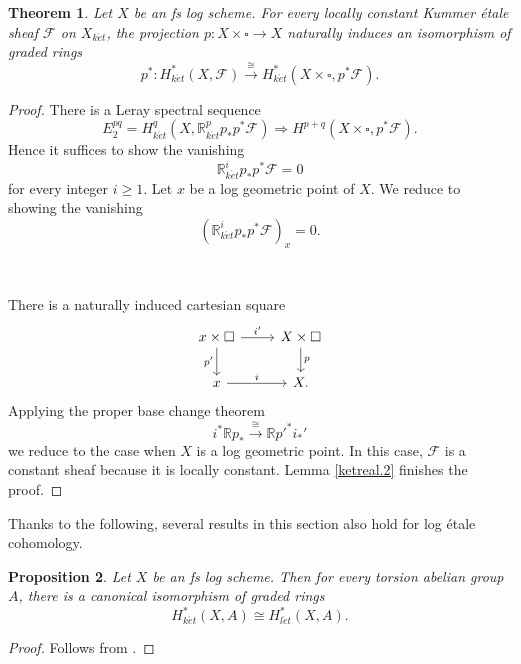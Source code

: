 \documentclass[11pt, a4paper]{amsart}
\newtheorem{thm}{Theorem}[subsection]
\newtheorem{prop}[thm]{Proposition}
\theoremstyle{definition}
\numberwithin{equation}{subsection}
\newcommand{\R}{\mathbb{R}}
\newcommand{\et}{{\acute{e}t}}
\newcommand{\ket}{{k\acute{e}t}}
\newcommand{\leta}{{l\acute{e}t}}
\newcommand{\cF}{\mathcal{F}}
\newcommand{\boxx}{\square}
\begin{document}
\begin{thm}
\label{ketreal.1}
Let $X$ be an fs log scheme.
For every locally constant Kummer \'etale sheaf $\cF$ on $X_{k\et}$, 
the projection $p\colon X\times \boxx\to X$ naturally induces an isomorphism of graded rings
\[
p^*\colon H_{k\et}^*(X,\cF)\xrightarrow{\cong} H_{k\et}^*(X\times \boxx,p^*\cF).
\]
\end{thm}
\begin{proof}
There is a Leray spectral sequence
\[
E_2^{pq}=H^q_{k\et}(X,\R^p_{k\et}p_*p^*\cF) \Rightarrow H^{p+q}(X\times \boxx,p^*\cF).
\]
Hence it suffices to show the vanishing
\[
\R^i_{k\et}p_*p^*\cF=0
\]
for every integer $i\geq 1$.
Let $x$ be a log geometric point of $X$.
We reduce to showing the vanishing
\[
(\R^i_{k\et}p_*p^*\cF)_x=0.
\]

\ 

There is a naturally induced cartesian square
\[
\begin{tikzcd}
x\times \boxx\arrow[d,"p'"']\arrow[r,"i'"]&
X\times \boxx\arrow[d,"p"]
\\
x\arrow[r,"i"]&
X.
\end{tikzcd}
\]
Applying the proper base change theorem \cite[Theorem 5.1]{MR1457738}
\[
i^*\R p_* \xrightarrow{\cong} \R p'^* i_*'
\]
we reduce to the case when $X$ is a log geometric point.
In this case, $\cF$ is a constant sheaf because it is locally constant.
Lemma \ref{ketreal.2} finishes the proof.
\end{proof}

Thanks to the following, 
several results in this section also hold for log \'etale cohomology.

\begin{prop}
\label{ketreal.15}
Let $X$ be an fs log scheme.
Then for every torsion abelian group $A$, 
there is a canonical isomorphism of graded rings
\[
H_{\ket}^*(X,A)
\cong
H_{\leta}^*(X,A).
\]
\end{prop}
\begin{proof}
Follows from \cite[Proposition 5.4(2)]{NakayamaII}.
\end{proof}
\end{document}
